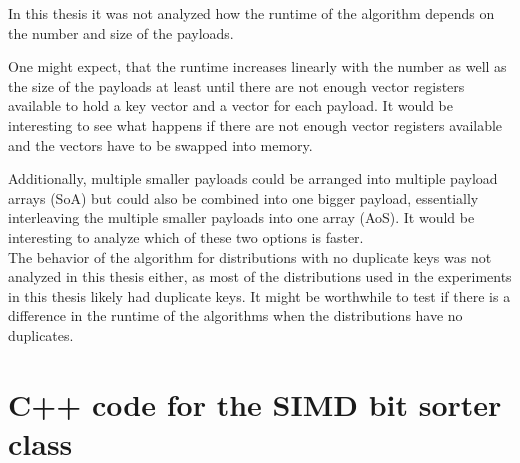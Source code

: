 \documentclass[12pt, a4paper, openright, twoside]{tiarbeit}
\begin{document}
In this thesis it was not analyzed how the runtime of the algorithm
depends on the number and size of the payloads.

One might expect, that the runtime increases linearly with the number
as well as the size of the payloads at least until there are not enough
vector registers available to hold a key vector and a vector for each
payload. It would be interesting to see what happens if there
are not enough vector registers available and the vectors have to be
swapped into memory.

Additionally, multiple smaller payloads could be arranged into multiple payload
arrays (SoA) but could also be combined into one bigger payload,
essentially interleaving the multiple smaller payloads into one array (AoS).
It would be interesting to analyze which of these two options is faster.\\

The behavior of the algorithm for distributions with no duplicate
keys was not analyzed in this thesis either, as most of the distributions
used in the experiments in this thesis likely
had duplicate keys. It might be worthwhile to test if there
is a difference in the runtime of the algorithms when the
distributions have no duplicates.

\appendix
\chapter{C++ code for the SIMD bit sorter class}
\label{appendix:bit_sorter_code}
\end{document}
